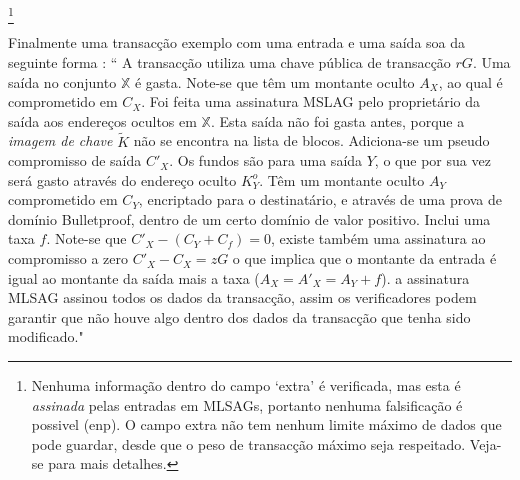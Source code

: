 \begin{itemize}

\footnote{Nenhuma informação dentro do campo `extra' é verificada, mas esta é {\em assinada} pelas entradas em MLSAGs, portanto nenhuma falsificação é possivel (enp). O campo extra não tem nenhum limite máximo de dados que pode guardar, desde que o peso de transacção máximo seja respeitado. Veja-se \cite{extra-field-stackexchange} para mais detalhes.}     
\end{itemize}

\newpage Finalmente uma transacção exemplo com uma entrada e uma saída soa da seguinte forma : 
`` A transacção utiliza uma chave pública de transacção $r G$. Uma saída no conjunto $\mathbb{X}$ é gasta. Note-se que têm um montante oculto $A_X$, ao qual é comprometido em $C_X$. Foi feita uma assinatura MSLAG pelo proprietário da saída aos endereços ocultos em $\mathbb{X}$. Esta saída não foi gasta antes, porque a {\em imagem de chave} $\tilde{K}$ não se encontra na lista de blocos. Adiciona-se um pseudo compromisso de saída $C'_X$. Os fundos são para uma saída $Y$, o que por sua vez será gasto através do endereço oculto $K^o_Y$. Têm um montante oculto $A_Y$ comprometido em $C_Y$, encriptado para o destinatário, e através de uma prova de domínio Bulletproof, dentro de um certo domínio de valor positivo.\newline
Inclui uma taxa $f$. Note-se que $C'_X - (C_Y + C_f) = 0$, existe também uma assinatura ao compromisso a zero $C'_X - C_X = z G$ o que implica que o montante da entrada é igual ao montante da saída mais a taxa ($A_X = A'_X = A_Y + f$). a assinatura MLSAG assinou todos os dados da transacção, assim os verificadores podem garantir que não houve algo dentro dos dados da transacção que tenha sido modificado."   

